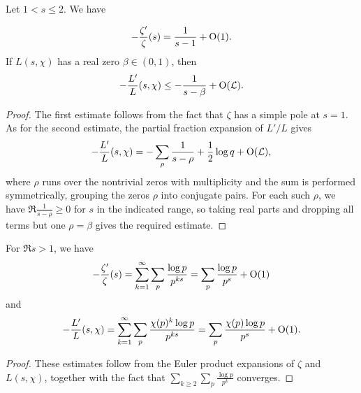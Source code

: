 \documentclass[reqno]{amsart} 
\begin{document}
\begin{lemma}\label{lemma:cus9we2fk5}
  Let $1 < s \leq 2$.  We have
  
  \begin{equation*}
    - \frac{\zeta '}{\zeta}(s) = \frac{1}{s - 1} + \operatorname{O}(1).
  \end{equation*}
  If $L(s, \chi)$ has a real zero $\beta \in (0, 1)$, then
  \begin{equation*}
    -\frac{L'}L(s,\chi)
    \leq - \frac{1}{s-\beta} +\operatorname{O}(\mathcal{L}).
  \end{equation*}
\end{lemma}
\begin{proof}
  The first estimate follows from the fact that $\zeta$ has a simple pole at $s = 1$.  As for the second estimate, the partial fraction expansion of $L'/L$ \cite[\S12, (17)--(18)]{Dav80} gives
  \begin{equation*}
    -\frac{L'}L(s,\chi)
    =- \sum_\rho \frac{1}{s-\rho}+ \frac12\log q+\operatorname{O}(\mathcal{L}),
  \end{equation*}
  where $\rho$ runs over the nontrivial zeros with multiplicity and the sum is performed symmetrically, grouping the zeros $\rho$ into conjugate pairs.  For each such $\rho$, we have $\Re \frac{1}{s - \rho} \geq 0$ for $s$ in the indicated range, so taking real parts and dropping all terms but one $\rho = \beta$ gives the required estimate.
\end{proof}

\begin{lemma}\label{lemma:cus9we1a1l}
  For $\Re s > 1$, we have
  \begin{equation*}
    - \frac{\zeta '}{\zeta}(s) = \sum_{k=1}^\infty \sum_p \frac{\log p}{p^{ks}}
    = \sum_p \frac{\log p}{p^s} + \operatorname{O}(1)
  \end{equation*}
  and
  \begin{equation*}
    - \frac{L'}{L}(s, \chi) = \sum_{k=1}^\infty \sum_p \frac{\chi(p)^k \log p}{p^{ks}}
    = \sum_p \frac{\chi(p)\log p}{p^s} + \operatorname{O}(1).
  \end{equation*}
\end{lemma}
\begin{proof}
  These estimates follow from the Euler product expansions of $\zeta$ and $L(s, \chi)$, together with the fact that $\sum_{k \geq 2} \sum_p \frac{\log p}{p^k}$ converges.
\end{proof}
\end{document}
